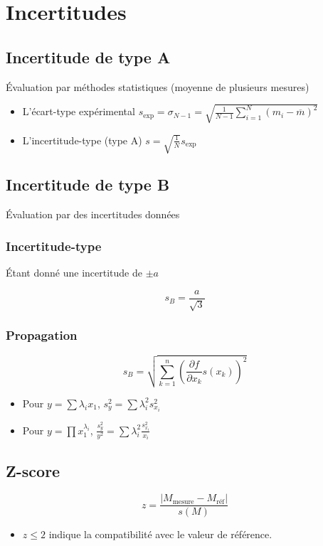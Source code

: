 \documentclass[openany]{book}
\begin{document}
\section{Incertitudes}
\subsection{Incertitude de type A}
Évaluation par méthodes statistiques (moyenne de plusieurs mesures)
\begin{itemize}
    \item L'écart-type expérimental $ s_{\text{exp}} = \sigma_{N-1} = \sqrt{\frac{1}{N-1}\sum_{i=1}^{N}(m_i-\overline{m})^2} $
    \item L'incertitude-type (type A) $ s = \sqrt{\frac{1}{N}}s_{\text{exp}} $
\end{itemize}

\subsection{Incertitude de type B}
Évaluation par des incertitudes données
\subsubsection{Incertitude-type}
Étant donné une incertitude de $ \pm a $

\[ s_B = \frac{a}{\sqrt{3}} \]

\subsubsection{Propagation}
\[ s_B = \sqrt{\sum_{k=1}^{n}(\frac{\partial f}{\partial x_k}s(x_k))^2} \]

\begin{itemize}
    \item Pour $y = \sum \lambda_ix_1$, $s_y^2 = \sum \lambda_i^2 s_{x_i}^2 $
    \item Pour $y = \prod x_1^{\lambda_i}$, $\frac{s_y^2}{y^2} = \sum \lambda_i^2 \frac{s_{x_i}^2}{x_i} $
\end{itemize}

\subsection{Z-score}
\[ z = \frac{|M_{\text{mesure}} - M_{\text{réf}}|}{s(M)} \]
\begin{itemize}
    \item $ z \leq 2 $ indique la compatibilité avec le valeur de référence. 
\end{itemize}
\end{document}
